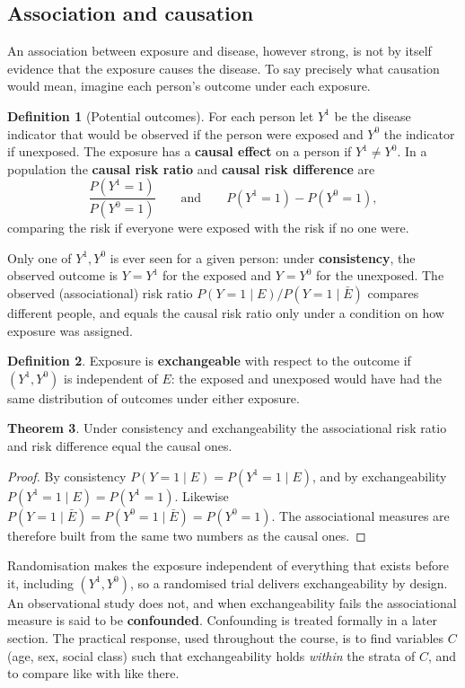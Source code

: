 \documentclass[11pt,a4paper]{article}
\numberwithin{equation}{section}
\theoremstyle{definition}
\newtheorem{thm}{Theorem}[subsection]
\newtheorem{defn}[thm]{Definition}
\begin{document}
\subsection{Association and causation}
\label{sec:causation}

An association between exposure and disease, however strong, is not by itself evidence that the exposure causes the disease. To say
precisely what causation would mean, imagine each person's outcome under each exposure.

\begin{defn}[Potential outcomes]
For each person let $Y^1$ be the disease indicator that would be observed if the person were exposed and $Y^0$ the indicator if unexposed.
The exposure has a \textbf{causal effect} on a person if $Y^1 \neq Y^0$. In a population the \textbf{causal risk ratio} and \textbf{causal risk difference} are
\[
\frac{P(Y^1 = 1)}{P(Y^0 = 1)} \qquad\text{and}\qquad P(Y^1 = 1) - P(Y^0 = 1) ,
\]
comparing the risk if everyone were exposed with the risk if no one were.
\end{defn}

Only one of $Y^1, Y^0$ is ever seen for a given person: under \textbf{consistency}, the observed outcome is $Y = Y^1$ for the exposed and $Y = Y^0$
for the unexposed. The observed (associational) risk ratio $P(Y = 1 \mid E)/P(Y = 1 \mid \bar E)$ compares different people, and equals the causal risk
ratio only under a condition on how exposure was assigned.

\begin{defn}
Exposure is \textbf{exchangeable} with respect to the outcome if $(Y^1, Y^0)$ is independent of $E$: the exposed and unexposed would have
had the same distribution of outcomes under either exposure.
\end{defn}

\begin{thm}
\label{thm:exchange}
Under consistency and exchangeability the associational risk ratio and risk difference equal the causal ones.
\end{thm}

\begin{proof}
By consistency $P(Y = 1 \mid E) = P(Y^1 = 1 \mid E)$, and by exchangeability $P(Y^1 = 1 \mid E) = P(Y^1 = 1)$. Likewise $P(Y = 1 \mid \bar E) = P(Y^0 = 1 \mid \bar E) = P(Y^0 = 1)$.
The associational measures are therefore built from the same two numbers as the causal ones.
\end{proof}

Randomisation makes the exposure independent of everything that exists before it, including $(Y^1, Y^0)$, so a randomised trial delivers
exchangeability by design. An observational study does not, and when exchangeability fails the associational measure is said to be
\textbf{confounded}. Confounding is treated formally in a later section. The practical response, used throughout the course, is to
find variables $C$ (age, sex, social class) such that exchangeability holds \emph{within} the strata of $C$, and to compare like with
like there.
\end{document}
